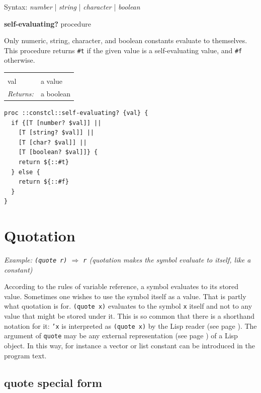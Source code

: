 \documentclass[a5paper,draft]{memoir}
\begin{document}
Syntax: \emph{number} | \emph{string} | \emph{character} | \emph{boolean}

\textbf{self-evaluating?} procedure

Only numeric, string, character, and boolean constants evaluate to themselves. This procedure returns \texttt{\#t} if the given value is a self-evaluating value, and \texttt{\#f} otherwise.

\noindent\begin{tabular}{ |p{1.9cm} p{6.5cm}| }
\hline
\rowcolor[HTML]{CCCCCC} \multicolumn{2}{|l|}{\textbf{self-evaluating? (internal)}} \\
val & a value \\
\textit{Returns:} & a boolean \\
\hline
\end{tabular}

\begin{lstlisting}
proc ::constcl::self-evaluating? {val} {
  if {[T [number? $val]] ||
    [T [string? $val]] ||
    [T [char? $val]] ||
    [T [boolean? $val]]} {
    return ${::#t}
  } else {
    return ${::#f}
  }
}
\end{lstlisting}

\section{Quotation}
\label{quotation}

\emph{Example: \texttt{(quote r)} $\Rightarrow$ \texttt{r} (quotation makes the symbol evaluate to itself, like a constant)}

According to the rules of variable reference, a symbol evaluates to its stored value. Sometimes one wishes to use the symbol itself as a value. That is partly what quotation is for. \texttt{(quote x)} evaluates to the symbol \texttt{x} itself and not to any value that might be stored under it. This is so common that there is a shorthand notation for it: \texttt{'x} is interpreted as \texttt{(quote x)} by the Lisp reader (see page \pageref{reader-procedures}). The argument of \texttt{quote} may be any external representation (see page \pageref{external-representation}) of a Lisp object. In this way, for instance a vector or list constant can be introduced in the program text.

\subsection{quote special form}
\label{quote-special-form}
\end{document}
